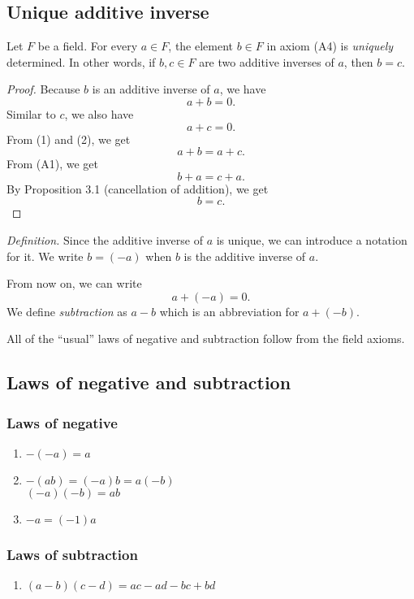 \documentclass[11pt]{article}
\begin{document}
    \subsection{Unique additive inverse}

    Let $F$ be a field. For every $a \in F$, the element \(b \in F\) in axiom (A4) is \emph{uniquely} determined. In other words, if \(b,c \in F\) are two additive inverses of $a$, then $b = c$.
    \begin{proof}
        Because $b$ is an additive inverse of $a$, we have 
        \begin{equation}
            a + b = 0.
        \end{equation}
        Similar to $c$, we also have 
        \begin{equation}
            a + c = 0.
        \end{equation}
        From (1) and (2), we get \[a + b = a + c.\] From (A1), we get \[b + a = c + a.\] By Proposition 3.1 (cancellation of addition), we get \[b = c.\]
    \end{proof}
    \emph{Definition.} Since the additive inverse of $a$ is unique, we can introduce a notation for it. We write \(b = (-a)\) when $b$ is the additive inverse of $a$.

    \vspace{1em}

    From now on, we can write \[a + (-a) = 0.\] We define \emph{subtraction} as \(a - b\) which is an abbreviation for \(a + (-b)\).

    \vspace{1em}

    All of the ``usual'' laws of negative and subtraction follow from the field axioms.

    \subsection{Laws of negative and subtraction}
    \subsubsection{Laws of negative}
    \begin{enumerate}
        \item \(-(-a) = a\) 
        \item \(-(ab) = (-a)b = a(-b)\) \\ \((-a)(-b)=ab\)
        \item \(-a = (-1)a\)
    \end{enumerate}

    \subsubsection{Laws of subtraction}
    \begin{enumerate}
        \item \((a-b)(c-d) = ac - ad - bc + bd\)
    \end{enumerate}
\end{document}
